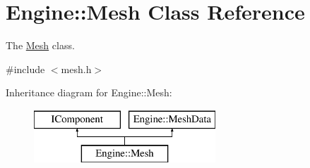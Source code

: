 \hypertarget{classEngine_1_1Mesh}{}\section{Engine\+:\+:Mesh Class Reference}
\label{classEngine_1_1Mesh}


The \hyperlink{classEngine_1_1Mesh}{Mesh} class.  




{\ttfamily \#include $<$mesh.\+h$>$}

Inheritance diagram for Engine\+:\+:Mesh\+:\begin{figure}[H]
\begin{center}
\leavevmode
\includegraphics[height=2.000000cm]{classEngine_1_1Mesh}
\end{center}
\end{figure}
